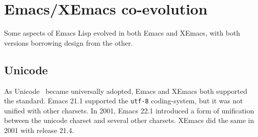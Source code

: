 \documentclass[format=acmsmall, review=false, screen=true]{acmart}
\begin{document}







\section{Emacs/XEmacs co-evolution}
\label{sec:coevolution}

Some aspects of Emacs Lisp evolved in both Emacs and XEmacs, with both
versions borrowing design from the other.

\subsection{Unicode}

As Unicode~\cite{Unicode6} became universally adopted, Emacs and
XEmacs both supported the standard.  Emacs 21.1 supported the
\texttt{utf-8} coding-system, but it was not unified with other
charsets.  In 2001, Emacs 22.1 introduced a form of unification
between the unicode charset and several other charsets.  XEmacs did
the same in 2001 with release 21.4.
\end{document}
